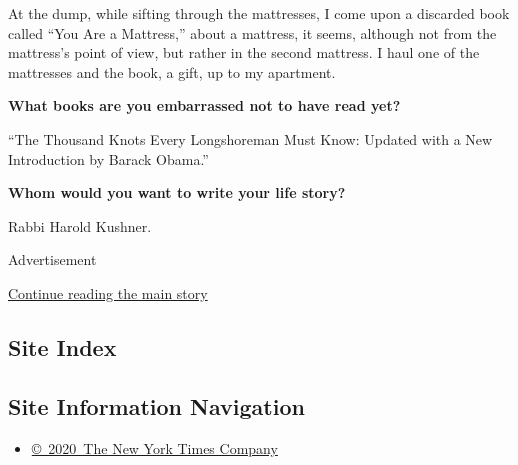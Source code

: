 At the dump, while sifting through the mattresses, I come upon a
discarded book called ``You Are a Mattress,'' about a mattress, it
seems, although not from the mattress's point of view, but rather in the
second mattress. I haul one of the mattresses and the book, a gift, up
to my apartment.

\textbf{What books are you embarrassed not to have read yet?}

``The Thousand Knots Every Longshoreman Must Know: Updated with a New
Introduction by Barack Obama.''

\textbf{Whom would you want to write your life story?}

Rabbi Harold Kushner.

Advertisement

\protect\hyperlink{after-bottom}{Continue reading the main story}

\hypertarget{site-index}{%
\subsection{Site Index}\label{site-index}}

\hypertarget{site-information-navigation}{%
\subsection{Site Information
Navigation}\label{site-information-navigation}}

\begin{itemize}
\tightlist
\item
  \href{https://help.nytimes3xbfgragh.onion/hc/en-us/articles/115014792127-Copyright-notice}{©~2020~The
  New York Times Company}
\end{itemize}

